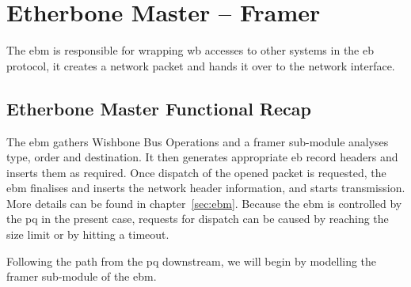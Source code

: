 \section{Etherbone Master -- Framer}
\label{sec:ebmf}

The \gls{ebm} is responsible for wrapping \gls{wb} accesses to other systems in the \gls{eb} protocol, it creates a network packet and hands it over to the network interface.

\subsection{Etherbone Master Functional Recap}

The \gls{ebm} gathers Wishbone Bus Operations and a framer sub-module analyses type, order and destination. It then generates appropriate \gls{eb} record headers and inserts them
as required. Once dispatch of the opened packet is requested, the \gls{ebm} finalises and inserts the network header information, and starts transmission.
More details can be found in chapter~\ref{sec:ebm}.
Because the \gls{ebm} is controlled by the \gls{pq} in the present case, requests for dispatch can be caused by reaching the size limit or by hitting a timeout.
\par
Following the path from the \gls{pq} downstream, we will begin by modelling the framer sub-module of the \gls{ebm}.

